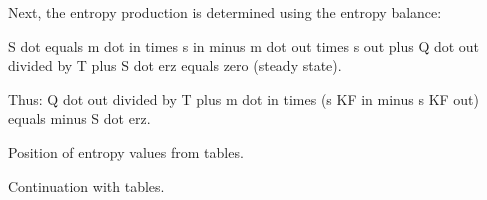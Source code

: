 Next, the entropy production is determined using the entropy balance:  

S dot equals m dot in times s in minus m dot out times s out plus Q dot out divided by T plus S dot erz equals zero (steady state).  

Thus:  
Q dot out divided by T plus m dot in times (s KF in minus s KF out) equals minus S dot erz.  

Position of entropy values from tables.  

Continuation with tables.